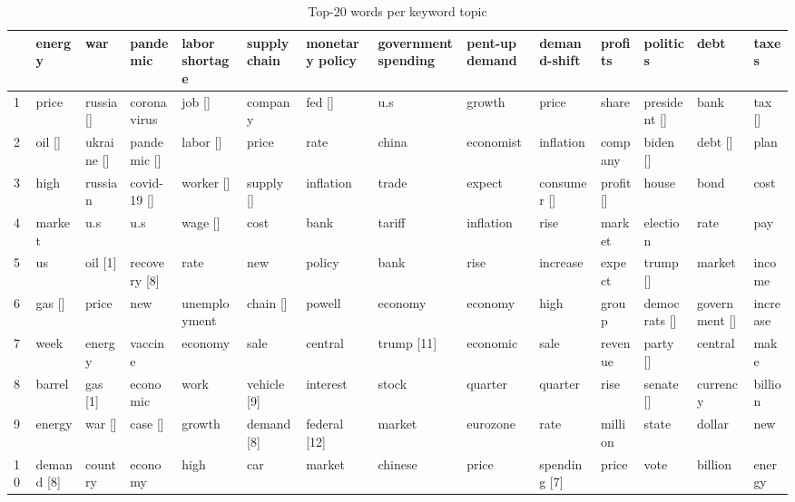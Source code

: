 
\begin{sidewaystable}[H]
	\centering
	\footnotesize
	\begin{tabular}{p{0.3cm}|p{1.4cm}|p{1.4cm}|p{1.4cm}|p{1.4cm}|p{1.4cm}|p{1.4cm}|p{1.4cm}|p{1.4cm}|p{1.4cm}|p{1.4cm}|p{1.4cm}|p{1.4cm}|p{1.4cm}}
	\caption{Top-20 words per keyword topic}\label{table:top_words}
	& energy & war & pandemic & labor shortage & supply chain & monetary policy & government spending & pent-up demand & demand-shift & profits & politics & debt & taxes \\ 
	\hline
	1 & price & russia [\checkmark] & coronavirus & job [\checkmark] & company & fed [\checkmark] & u.s & growth & price & share & president [\checkmark] & bank & tax [\checkmark] \\ 
	2 & oil [\checkmark] & ukraine [\checkmark] & pandemic [\checkmark] & labor [\checkmark] & price & rate & china & economist & inflation & company & biden [\checkmark] & debt [\checkmark] & plan \\ 
	3 & high & russian & covid-19 [\checkmark] & worker [\checkmark] & supply [\checkmark] & inflation & trade & expect & consumer [\checkmark] & profit [\checkmark] & house & bond & cost \\ 
	4 & market & u.s & u.s & wage [\checkmark] & cost & bank & tariff & inflation & rise & market & election & rate & pay \\ 
	5 & us & oil [1] & recovery [8] & rate & new & policy & bank & rise & increase & expect & trump [\checkmark] & market & income \\ 
	6 & gas [\checkmark] & price & new & unemployment & chain [\checkmark] & powell & economy & economy & high & group & democrats [\checkmark] & government [\checkmark] & increase \\ 
	7 & week & energy & vaccine & economy & sale & central & trump [11] & economic & sale & revenue & party [\checkmark] & central & make \\ 
	8 & barrel & gas [1] & economic & work & vehicle [9] & interest & stock & quarter & quarter & rise & senate [\checkmark] & currency & billion \\ 
	9 & energy & war [\checkmark] & case [\checkmark] & growth & demand [8] & federal [12] & market & eurozone & rate & million & state & dollar & new \\ 
	10 & demand [8] & country & economy & high & car & market & chinese & price & spending [7] & price & vote & billion & energy \\ 

\end{tabular}
\end{sidewaystable}

